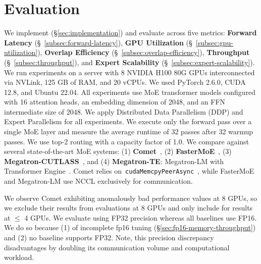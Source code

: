 \section{Evaluation}
\label{sec:evaluation}
We implement (\S\ref{sec:implementation}) and evaluate \sysname across
five metrics: \textbf{Forward Latency} (\S~\ref{subsec:forward-latency}),
\textbf{GPU Utilization} (\S~\ref{subsec:gpu-utilization}),
\textbf{Overlap Efficiency} (\S~\ref{subsec:overlap-efficiency}),
\textbf{Throughput} (\S~\ref{subsec:throughput}), and \textbf{Expert Scalability} (\S~\ref{subsec:expert-scalability}).
We run experiments on a server with 8 NVIDIA H100 80G GPUs interconnected via NVLink,
125 GB of RAM, and 20 vCPUs. We used PyTorch 2.6.0, CUDA 12.8, and Ubuntu 22.04.
All experiments use MoE transformer models configured with 16 attention heads,
an embedding dimension of 2048, and an FFN intermediate size of 2048.
We apply Distributed Data Parallelism (DDP) and Expert Parallelism for all experiments.
We execute only the forward pass over a single MoE layer and measure the average runtime
of 32 passes after 32 warmup passes.
We use top-2 routing with a capacity factor of 1.0.
We compare \sysname against several state-of-the-art MoE systems:
(1) \textbf{Comet}~\cite{comet}, 
(2) \textbf{FasterMoE}~\cite{fastermoe}, 
(3) \textbf{Megatron-CUTLASS}~\cite{megatron}, and
(4) \textbf{Megatron-TE}: Megatron-LM with Transformer Engine~\cite{transformer-engine}.
Comet relies on~\verb|cudaMemcpyPeerAsync|~\cite{fluxp2p}, while FasterMoE and Megatron-LM use NCCL exclusively for communication.

We observe Comet exhibiting anomalously bad performance values at 8 GPUs,
so we exclude their results from evaluations at 8 GPUs and only include for results at $\leq$
4 GPUs. We evaluate \sysname using FP32 precision whereas all baselines use FP16.
We do so because (1) of incomplete fp16 tuning (\S\ref{sec:fp16-memory-throughput})
and (2) no baseline supports FP32.
Note, this precision discrepancy disadvantages \sysname by doubling its
communication volume and computational workload.
